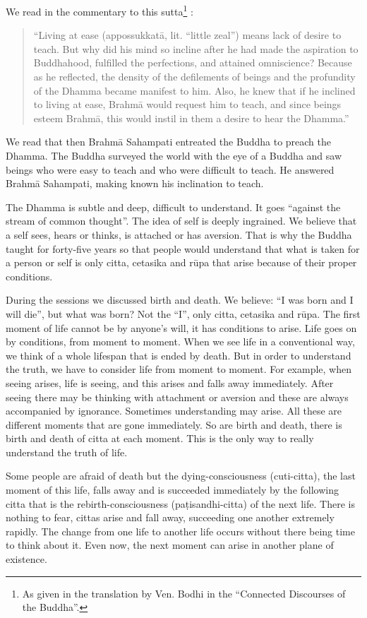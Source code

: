 We read in the commentary to this
sutta\footnote{As given in the
translation by Ven. Bodhi in the ``Connected Discourses of the Buddha''.} :

\begin{quote}
``Living at ease (appossukkatā, lit. ``little zeal'') means lack of
desire to teach. But why did his mind so incline after he had made the
aspiration to Buddhahood, fulfilled the perfections, and attained
omniscience? Because as he reflected, the density of the defilements of
beings and the profundity of the Dhamma became manifest to him. Also, he
knew that if he inclined to living at ease, Brahmā would request him to
teach, and since beings esteem Brahmā, this would instil in them a
desire to hear the Dhamma.''
\end{quote}

We read that then Brahmā Sahampati entreated the Buddha to preach the
Dhamma. The Buddha surveyed the world with the eye of a Buddha and saw
beings who were easy to teach and who were difficult to teach. He
answered Brahmā Sahampati, making known his inclination to teach.

The Dhamma is subtle and deep, difficult to understand. It goes
``against the stream of common thought''. The idea of self is deeply
ingrained. We believe that a self sees, hears or thinks, is attached or
has aversion. That is why the Buddha taught for forty-five years so that
people would understand that what is taken for a person or self is only
citta, cetasika and rūpa that arise because of their proper conditions.

During the sessions we discussed birth and death. We believe: ``I was
born and I will die'', but what was born? Not the ``I'', only citta,
cetasika and rūpa. The first moment of life cannot be by anyone's will,
it has conditions to arise. Life goes on by conditions, from moment to
moment. When we see life in a conventional way, we think of a whole
lifespan that is ended by death. But in order to understand the truth,
we have to consider life from moment to moment. For example, when seeing
arises, life is seeing, and this arises and falls away immediately.
After seeing there may be thinking with attachment or aversion and these
are always accompanied by ignorance. Sometimes understanding may arise.
All these are different moments that are gone immediately. So are birth
and death, there is birth and death of citta at each moment. This is the
only way to really understand the truth of life.

Some people are afraid of death but the dying-consciousness
(cuti-citta), the last moment of this life, falls away and is succeeded
immediately by the following citta that is the rebirth-consciousness
(paṭisandhi-citta) of the next life. There is nothing to fear, cittas
arise and fall away, succeeding one another extremely rapidly. The
change from one life to another life occurs without there being time to
think about it. Even now, the next moment can arise in another plane of
existence.

